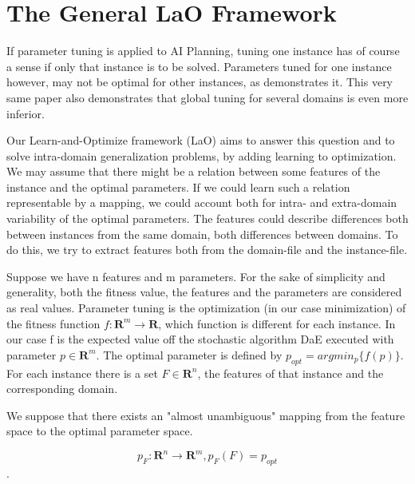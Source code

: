\documentclass{article}
\begin{document}
\section{The General LaO Framework}
\label{section:general}

If parameter tuning is applied to AI Planning, tuning one instance has of course a sense if only that instance is to be solved. Parameters tuned for one instance however, may not be optimal for other instances, as \cite{BibGECCO:2010} demonstrates it. This very same paper also demonstrates that global tuning for several domains is even more inferior.

Our Learn-and-Optimize framework (LaO) aims to answer this question and to solve intra-domain generalization problems, by adding learning to optimization. We may assume that there might be a relation between some features of the instance and the optimal parameters. If we could learn such a relation representable by a mapping, we could account both for intra- and extra-domain variability of the optimal parameters. The features could describe differences both between instances from the same domain, both differences between domains. To do this, we try to extract features both from the domain-file and the instance-file.

Suppose we have n features and m parameters. For the sake of simplicity and generality, both the fitness value, the features and the parameters are considered as real values. Parameter tuning is the optimization (in our case minimization) of the fitness function \begin{math}f:\mathbf{R}^m\to \mathbf{R} \end{math}, which function is different for each instance. In our case f is the expected value off the stochastic algorithm DaE executed with parameter \begin{math} p \in \mathbf{R}^m \end{math}. The optimal parameter is defined by \begin{math} p_{opt}=argmin_p\{f(p)\} \end{math}. For each instance there is a set \begin{math} F \in \mathbf{R}^n \end{math}, the features of that instance and the corresponding domain. 

We suppose that there exists an "almost unambiguous" mapping from the feature space to the optimal parameter space. 

\begin{equation} p_F: \mathbf{R}^n \to \mathbf{R}^m, p_F(F)=p_{opt} \end{equation}.	
\end{document}
